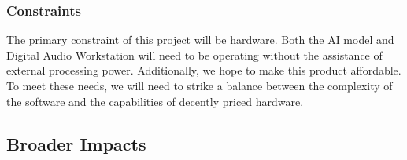 \subsubsection{Constraints}

The primary constraint of this project will be hardware. Both the AI model and Digital
Audio Workstation will need to be operating without the assistance of external
processing power. Additionally, we hope to make this product affordable. To meet
these needs, we will need to strike a balance between the complexity of the software
and the capabilities of decently priced hardware.



\subsection{Broader Impacts}

